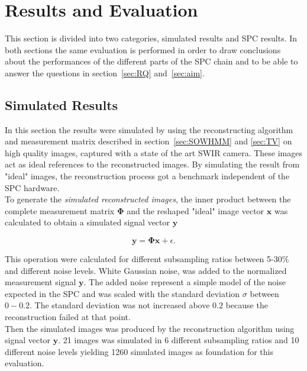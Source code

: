 \section{Results and Evaluation}
\label{sec:Evaluation} 
This section is divided into two categories, simulated results and SPC results. In both sections the same evaluation is performed in order to draw conclusions about the performances of the different parts of the SPC chain and to be able to answer the questions in section~\ref{sec:RQ} and~\ref{sec:aim}.\\[0.1in]



\subsection{Simulated Results}
\label{sec:simulated_results}
In this section the results were simulated by using the reconstructing algorithm and measurement matrix described in section~\ref{sec:SOWHMM} and \ref{sec:TV} on high quality images, captured with a state of the art SWIR camera. These images act as ideal references to the reconstructed images. By simulating the result from "ideal" images, the reconstruction process got a benchmark independent of the SPC hardware.\\[0.1in]

To generate the \textit{simulated reconstructed images}, the inner product between the complete measurement matrix $\mathbf{\Phi}$ and the reshaped "ideal" image vector $\mathbf{x}$ was calculated to obtain a simulated signal vector $\mathbf{y}$

\begin{equation}
\mathbf{y} = \mathbf{\Phi}\mathbf{x} + \epsilon.
\end{equation} 
 
This operation were calculated for different subsampling ratios between 5-30\% and different noise levels. White Gaussian noise, was added to the normalized measurement signal $\mathbf{y}$. The added noise represent a simple model of the noise expected in the SPC and was scaled with the standard deviation $\sigma$ between $0 - 0.2$. The standard deviation was not increased above $0.2$ because the reconstruction failed at that point. \\[0.1in] 

Then the simulated images was produced by the reconstruction algorithm using signal vector $\mathbf{y}$. 21 images was simulated in 6 different subsampling ratios and 10 different noise levels yielding 1260 simulated images as foundation for this evaluation.

